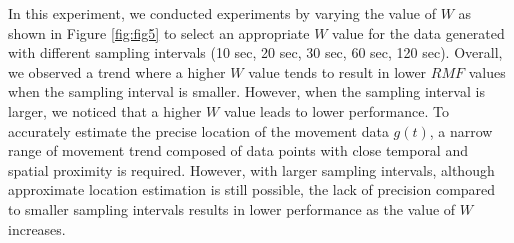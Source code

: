 \documentclass[preprint,12pt]{elsarticle}
\begin{document}
In this experiment, we conducted experiments by varying the value of $W$ as shown in Figure \ref{fig:fig5} to select an appropriate $W$ value for the data generated with different sampling intervals (10 sec, 20 sec, 30 sec, 60 sec, 120 sec). Overall, we observed a trend where a higher $W$ value tends to result in lower $RMF$ values when the sampling interval is smaller. However, when the sampling interval is larger, we noticed that a higher $W$ value leads to lower performance. To accurately estimate the precise location of the movement data $g(t)$, a narrow range of movement trend composed of data points with close temporal and spatial proximity is required. However, with larger sampling intervals, although approximate location estimation is still possible, the lack of precision compared to smaller sampling intervals results in lower performance as the value of $W$ increases.
\end{document}
